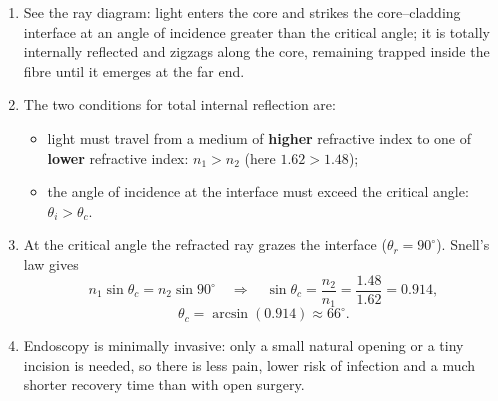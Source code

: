 \documentclass[11pt]{article}
\providecommand{\degree}{^{\circ}}
\begin{document}
\begin{corrige}
\begin{enumerate}
\item See the ray diagram: light enters the core and strikes the core--cladding interface at an angle of incidence greater than the critical angle; it is totally internally reflected and zigzags along the core, remaining trapped inside the fibre until it emerges at the far end.
\item The two conditions for total internal reflection are:
\begin{itemize}
\item light must travel from a medium of \textbf{higher} refractive index to one of \textbf{lower} refractive index: $n_1 > n_2$ (here $1.62 > 1.48$);
\item the angle of incidence at the interface must exceed the critical angle: $\theta_i > \theta_c$.
\end{itemize}
\item At the critical angle the refracted ray grazes the interface ($\theta_r = 90\degree$). Snell's law gives
\[ n_1 \sin\theta_c = n_2 \sin 90\degree \quad\Longrightarrow\quad \sin\theta_c = \frac{n_2}{n_1} = \frac{1.48}{1.62} = 0.914, \]
\[ \theta_c = \arcsin(0.914) \approx 66\degree. \]
\item Endoscopy is minimally invasive: only a small natural opening or a tiny incision is needed, so there is less pain, lower risk of infection and a much shorter recovery time than with open surgery.
\end{enumerate}
\end{corrige}
\end{document}
